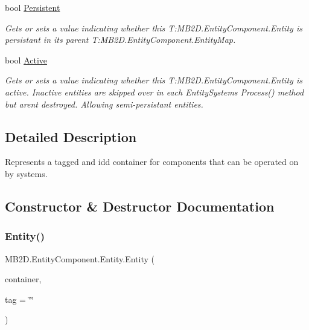 \begin{DoxyCompactItemize}
bool \hyperlink{class_m_b2_d_1_1_entity_component_1_1_entity_af72e02dfa9b3b5a24e7c97eb6ce2fd3a}{Persistent}
\begin{DoxyCompactList}\small\item\em Gets or sets a value indicating whether this T\+:\+M\+B2\+D.\+Entity\+Component.\+Entity is persistant in its parent T\+:\+M\+B2\+D.\+Entity\+Component.\+Entity\+Map. \end{DoxyCompactList}\item 
bool \hyperlink{class_m_b2_d_1_1_entity_component_1_1_entity_a3860df1e77b87727abd227e9e713a97b}{Active}
\begin{DoxyCompactList}\small\item\em Gets or sets a value indicating whether this T\+:\+M\+B2\+D.\+Entity\+Component.\+Entity is active. Inactive entities are skipped over in each Entity\+Systems Process() method but aren\textquotesingle{}t destroyed. Allowing semi-\/persistant entities. \end{DoxyCompactList}\end{DoxyCompactItemize}


\subsection{Detailed Description}
Represents a tagged and id\textquotesingle{}d container for components that can be operated on by systems. 



\subsection{Constructor \& Destructor Documentation}
\hypertarget{class_m_b2_d_1_1_entity_component_1_1_entity_a6decb855bea1bcf18cd6c2869ebc16a6}{}\label{class_m_b2_d_1_1_entity_component_1_1_entity_a6decb855bea1bcf18cd6c2869ebc16a6} 
\subsubsection{\texorpdfstring{Entity()}{Entity()}}
{\footnotesize\ttfamily M\+B2\+D.\+Entity\+Component.\+Entity.\+Entity (\begin{DoxyParamCaption}\item[{\hyperlink{class_m_b2_d_1_1_entity_component_1_1_entity_map}{Entity\+Map}}]{container,  }\item[{string}]{tag = {\ttfamily \char`\"{}\char`\"{}} }\end{DoxyParamCaption})\hspace{0.3cm}{\ttfamily [inline]}}



